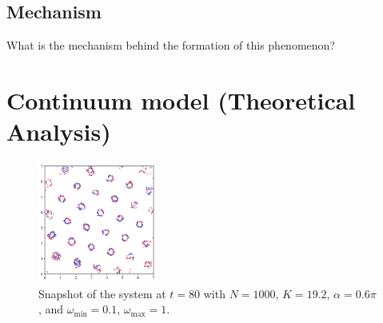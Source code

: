 \documentclass{article}
\begin{document}
\subsection{Mechanism}
What is the mechanism behind the formation of this phenomenon?

\section{Continuum model (Theoretical Analysis)}

\begin{figure}
    \centering
    \includegraphics[width=0.35\textwidth]{./figs/snapshot.png}
    \caption{
        \label{fig:snapshot}
        Snapshot of the system at $t=80$ with $N=1000$, $K=19.2$, $\alpha =0.6\pi$, and $\omega _{\min}=0.1$, $\omega _{\max}=1$.
    }
\end{figure}


\end{document}
